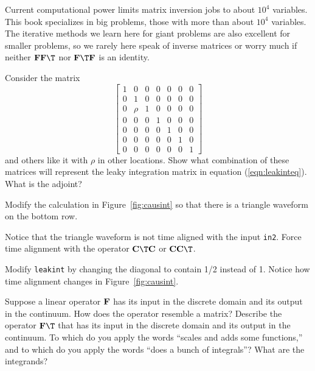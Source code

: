 \par
Current computational power limits matrix inversion
jobs to about $10^4$ variables.
This book specializes in big problems,
those with more than about $10^4$ variables.
The iterative methods we learn here for giant problems
are also excellent for smaller problems,
so we rarely here speak of inverse matrices
or worry much if neither
$\bold F \bold F\T$
nor
$\bold F\T \bold F$ is an identity.

\begin{exer}
\item
Consider the matrix
\begin{equation}
  \left[
        \begin{array}{cccccccc}
             1 &     0 &     0 &     0 &     0 &     0 &     0 \\
             0 &     1 &     0 &     0 &     0 &     0 &     0 \\
             0 &  \rho &     1 &     0 &     0 &     0 &     0 \\
             0 &     0 &     0 &     1 &     0 &     0 &     0 \\
             0 &     0 &     0 &     0 &     1 &     0 &     0 \\
             0 &     0 &     0 &     0 &     0 &     1 &     0 \\
             0 &     0 &     0 &     0 &     0 &     0 &     1 
        \end{array}
  \right]
\end{equation}
and others like it with $\rho$ in other locations.
Show what combination of these matrices will represent
the leaky integration matrix
in equation (\ref{eqn:leakinteq}).  What is the adjoint?
\item
Modify the calculation in Figure~\ref{fig:causint} so that there is
a triangle waveform on the bottom row.
\item
Notice that the triangle waveform is not time aligned
with the input {\tt in2}.
Force time alignment with the operator 
${\bold C\T \bold C}$ or
${\bold C  \bold C\T}$.
\item
Modify \texttt{leakint}
by changing the diagonal to contain
1/2 instead of 1.
Notice how time alignment changes in Figure~\ref{fig:causint}.
\item
Suppose a linear operator $\bold F$ has
its input in the discrete domain and
its output in the continuum.
How does the operator resemble a matrix?
Describe the operator $\bold F\T$ that has
its input in the discrete domain and
its output in the continuum.
To which do you apply the words
``scales and adds some functions,''
and to which do you apply the words
``does a bunch of integrals''?
What are the integrands?


\end{exer}
